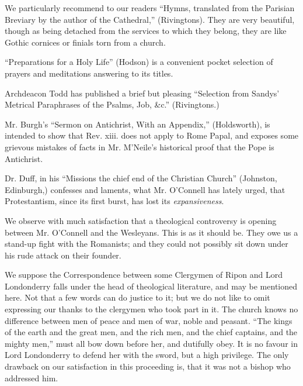 We particularly recommend to our readers ``Hymns,
translated from the Parisian Breviary by the author of the Cathedral,'' (Rivingtons).
They are very beautiful, though as being detached from the
services to which they belong, they are like Gothic cornices or finials
torn from a church.

``Preparations for a Holy Life'' (Hodson) is a
convenient pocket selection of prayers and meditations answering to its
titles.

Archdeacon Todd has published a brief but pleasing ``Selection
from Sandys' Metrical Paraphrases of the Psalms, Job, \&c.'' (Rivingtons.)

Mr. Burgh's ``Sermon on Antichrist, With an
Appendix,'' (Holdsworth), is intended to show that Rev. xiii. does not
apply to Rome Papal, and exposes some grievous mistakes of facts in Mr.
M'Neile's historical proof that the Pope is Antichrist.

Dr. Duff, in his ``Missions the chief end of the
Christian Church'' (Johnston, Edinburgh,) confesses and laments, what Mr.
O'Connell has lately urged, that Protestantism, since its first burst,
has lost its \emph{expansiveness}.

We observe with much satisfaction that a
theological controversy is opening between Mr. O'Connell and the
Wesleyans. This is as it should be. They owe us a stand-up fight with
the Romanists; and they could not possibly sit down under his rude
attack on their founder.

We suppose the Correspondence between some
Clergymen of Ripon and Lord Londonderry falls under the head of
theological literature, and may be mentioned here. Not that a few words
can do justice to it; but we do not like to omit expressing our thanks
to the clergymen who took part in it. The church knows no difference
between men of peace and men of war, noble and peasant. ``The kings of
the earth and the great men, and the rich men, and the chief captains,
and the mighty men,'' must all bow down before her, and dutifully obey.
It is no favour in Lord Londonderry to defend her with the sword, but a
high privilege. The only drawback on our satisfaction in this proceeding
is, that it was not a bishop who addressed him.


